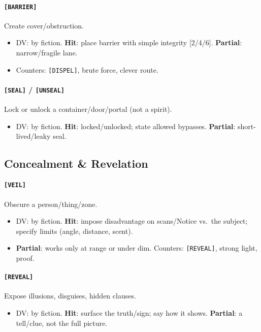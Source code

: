\documentclass[11pt]{article}
\begin{document}
\paragraph{\texttt{[BARRIER]}} Create cover/obstruction.
\begin{itemize}
  \item DV: by fiction. \textbf{Hit}: place barrier with simple integrity [2/4/6]. \textbf{Partial}: narrow/fragile lane.
  \item Counters: \texttt{[DISPEL]}, brute force, clever route.
\end{itemize}

\paragraph{\texttt{[SEAL]} / \texttt{[UNSEAL]}} Lock or unlock a container/door/portal (not a spirit).
\begin{itemize}
  \item DV: by fiction. \textbf{Hit}: locked/unlocked; state allowed bypasses. \textbf{Partial}: short-lived/leaky seal.
\end{itemize}

\subsection*{Concealment \& Revelation}
\paragraph{\texttt{[VEIL]}} Obscure a person/thing/zone.
\begin{itemize}
  \item DV: by fiction. \textbf{Hit}: impose disadvantage on scans/Notice vs.\ the subject; specify limits (angle, distance, scent).
  \item \textbf{Partial}: works only at range or under dim. Counters: \texttt{[REVEAL]}, strong light, proof.
\end{itemize}

\paragraph{\texttt{[REVEAL]}} Expose illusions, disguises, hidden clauses.
\begin{itemize}
  \item DV: by fiction. \textbf{Hit}: surface the truth/sign; say how it shows. \textbf{Partial}: a tell/clue, not the full picture.
\end{itemize}
\end{document}
